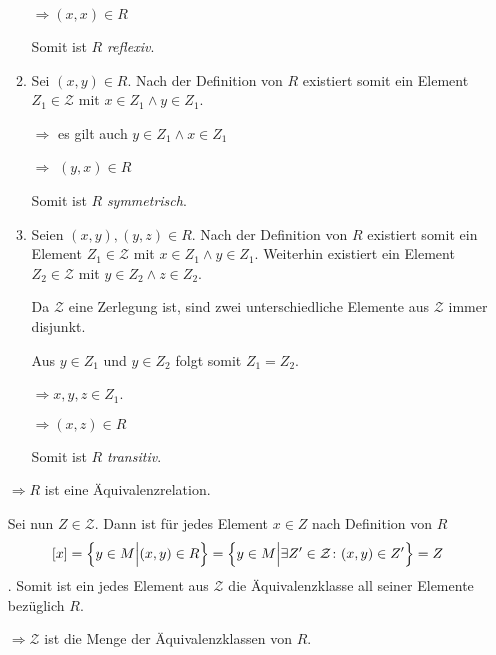 \documentclass{scrreprt}
\begin{document}
\begin{enumerate}[(a)]
\begin{enumerate}[1)]
    $\Rightarrow (x, x) \in R$

    Somit ist $R$ \emph{reflexiv}.

  \item Sei $(x, y) \in R$.
    Nach der Definition von $R$ existiert somit ein Element
    $Z_1 \in \mathcal{Z}$ mit $x \in Z_1 \land y \in Z_1$.

    $\Rightarrow$ es gilt auch $y \in Z_1 \land x \in Z_1$

    $\Rightarrow$ $(y, x) \in R$

    Somit ist $R$ \emph{symmetrisch}.

  \item Seien $(x, y), (y, z) \in R$.
    Nach der Definition von $R$ existiert somit ein Element
    $Z_1 \in \mathcal{Z}$ mit $x \in Z_1 \land y \in Z_1$.
    Weiterhin existiert ein Element $Z_2 \in \mathcal{Z}$ mit
    $y \in Z_2 \land z \in Z_2$.

    Da $\mathcal{Z}$ eine Zerlegung ist, sind zwei unterschiedliche Elemente aus
    $\mathcal{Z}$ immer disjunkt.

    Aus $y \in Z_1$ und $y \in Z_2$ folgt somit $Z_1 = Z_2$.

    $\Rightarrow x, y, z \in Z_1$.

    $\Rightarrow (x, z) \in R$

    Somit ist $R$ \emph{transitiv}.
  \end{enumerate}

  $\Rightarrow R$ ist eine Äquivalenzrelation.

  Sei nun $Z \in \mathcal{Z}$.
  Dann ist für jedes Element $x \in Z$ nach Definition von $R$
  \[
    \qty[x] = \qty{y \in M {\Big |} (x, y) \in R}
    = \qty{y \in M {\Big |} \exists Z' \in \mathcal{Z} \colon (x, y) \in Z'} = Z
  \].
  Somit ist ein jedes Element aus $\mathcal{Z}$ die Äquivalenzklasse all seiner
  Elemente bezüglich $R$.

  $\Rightarrow \mathcal{Z}$ ist die Menge der Äquivalenzklassen von $R$.
\end{enumerate}
\end{document}
